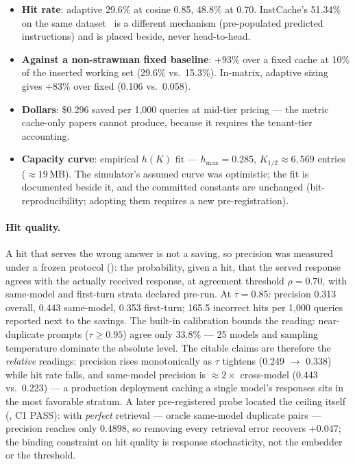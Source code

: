 \begin{itemize}
  \item \textbf{Hit rate}: adaptive 29.6\% at cosine 0.85, 48.8\% at 0.70.
        InstCache's 51.34\% on the same dataset~\citep{instcache2024} is a
        different mechanism (pre-populated predicted instructions) and is
        placed beside, never head-to-head.
  \item \textbf{Against a non-strawman fixed baseline}: $+93\%$ over a fixed
        cache at 10\% of the inserted working set (29.6\% vs.\ 15.3\%).
        In-matrix, adaptive sizing gives $+83\%$ over fixed (0.106 vs.\
        0.058).
  \item \textbf{Dollars}: \$0.296 saved per 1{,}000 queries at mid-tier
        pricing --- the metric cache-only papers cannot produce, because it
        requires the tenant-tier accounting.
  \item \textbf{Capacity curve}: empirical $h(K)$ fit --- $h_{\max}=0.285$,
        $K_{1/2}\approx 6{,}569$ entries (${\approx}19$\,MB). The
        simulator's assumed curve was optimistic; the fit is documented
        beside it, and the committed constants are unchanged
        (bit-reproducibility; adopting them requires a new
        pre-registration).
\end{itemize}

\paragraph{Hit quality.} A hit that serves the wrong answer is not a saving,
so precision was measured under a frozen protocol
(): the probability, given a hit, that the
served response agrees with the actually received response, at agreement
threshold $\rho=0.70$, with same-model and first-turn strata declared
pre-run. At
$\tau{=}0.85$: precision 0.313 overall, 0.443 same-model, 0.353 first-turn;
165.5 incorrect hits per 1{,}000 queries reported next to the savings. The
built-in calibration bounds the reading: near-duplicate prompts
($\tau\ge0.95$) agree only 33.8\% --- 25 models and sampling temperature
dominate the absolute level. The citable claims are therefore the
\emph{relative} readings: precision rises monotonically as $\tau$ tightens
(0.249 $\to$ 0.338) while hit rate falls, and same-model precision is
${\approx}2\times$ cross-model (0.443 vs.\ 0.223) --- a production
deployment caching a single model's responses sits in the most favorable
stratum. A later pre-registered probe located the ceiling itself
(\evfile{RESULTS\_CACHE\_CEILING.md}, C1 PASS): with \emph{perfect}
retrieval --- oracle same-model duplicate pairs --- precision reaches only
0.4898, so removing every retrieval error recovers $+0.047$; the binding
constraint on hit quality is response stochasticity, not the embedder or
the threshold.


